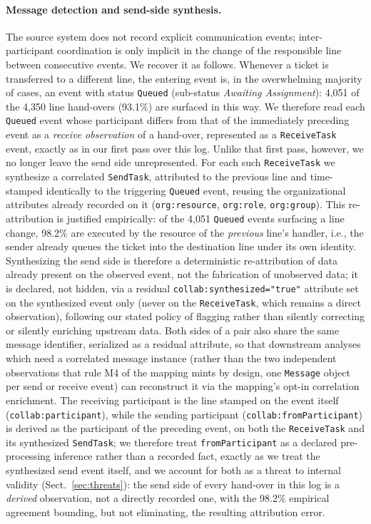 \paragraph{Message detection and send-side synthesis.}
The source system does not record explicit communication events;
inter-participant coordination is only implicit in the change of the
responsible line between consecutive events. We recover it as follows.
Whenever a ticket is transferred to a different line, the entering event is,
in the overwhelming majority of cases, an event with status \texttt{Queued}
(sub-status \emph{Awaiting Assignment}): 4{,}051 of the 4{,}350 line
hand-overs (93.1\%) are surfaced in this way. We therefore read each
\texttt{Queued} event whose participant differs from that of the immediately
preceding event as a \emph{receive observation} of a hand-over, represented
as a \texttt{ReceiveTask} event, exactly as in our first pass over this log.
Unlike that first pass, however, we no longer leave the send side
unrepresented. For each such \texttt{ReceiveTask} we synthesize a
correlated \texttt{SendTask}, attributed to the previous line and time-stamped
identically to the triggering \texttt{Queued} event, reusing the
organizational attributes already recorded on it
(\texttt{org:resource}, \texttt{org:role}, \texttt{org:group}). This
re-attribution is justified empirically: of the 4{,}051 \texttt{Queued}
events surfacing a line change, 98.2\% are executed by the resource of the
\emph{previous} line's handler, i.e., the sender already queues the ticket
into the destination line under its own identity. Synthesizing the send
side is therefore a deterministic re-attribution of data already present on
the observed event, not the fabrication of unobserved data; it is declared,
not hidden, via a residual \texttt{collab:synthesized="true"} attribute set
on the synthesized event only (never on the \texttt{ReceiveTask}, which
remains a direct observation), following our stated policy of flagging
rather than silently correcting or silently enriching upstream data. Both
sides of a pair also share the same message identifier, serialized as a
residual attribute, so that downstream analyses which need a correlated
message instance (rather than the two independent observations that rule M4
of the mapping mints by design, one \texttt{Message} object per send or
receive event) can reconstruct it via the mapping's opt-in correlation
enrichment. The receiving participant is the line stamped on the event
itself (\texttt{collab:participant}), while the sending participant
(\texttt{collab:fromParticipant}) is derived as the participant of the
preceding event, on both the \texttt{ReceiveTask} and its synthesized
\texttt{SendTask}; we therefore treat \texttt{fromParticipant} as a declared
pre-processing inference rather than a recorded fact, exactly as we treat
the synthesized send event itself, and we account for both as a threat to
internal validity (Sect.~\ref{sec:threats}): the send side of every
hand-over in this log is a \emph{derived} observation, not a directly
recorded one, with the 98.2\% empirical agreement bounding, but not
eliminating, the resulting attribution error.

